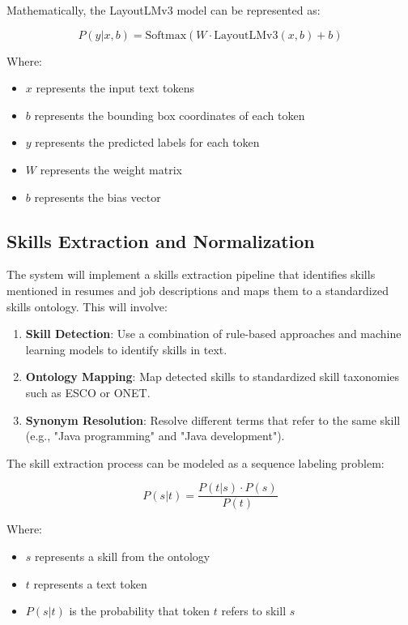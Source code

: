 \documentclass[12pt,a4paper]{report}
\begin{document}
Mathematically, the LayoutLMv3 model can be represented as:

\begin{equation}
    P(y|x, b) = \text{Softmax}(W \cdot \text{LayoutLMv3}(x, b) + b)
\end{equation}

Where:
\begin{itemize}
    \item $x$ represents the input text tokens
    \item $b$ represents the bounding box coordinates of each token
    \item $y$ represents the predicted labels for each token
    \item $W$ represents the weight matrix
    \item $b$ represents the bias vector
\end{itemize}

\subsection*{Skills Extraction and Normalization}

The system will implement a skills extraction pipeline that identifies skills mentioned in resumes and job descriptions and maps them to a standardized skills ontology. This will involve:

\begin{enumerate}
    \item \textbf{Skill Detection}: Use a combination of rule-based approaches and machine learning models to identify skills in text.
    \item \textbf{Ontology Mapping}: Map detected skills to standardized skill taxonomies such as ESCO or ONET.
    \item \textbf{Synonym Resolution}: Resolve different terms that refer to the same skill (e.g., "Java programming" and "Java development").
\end{enumerate}

The skill extraction process can be modeled as a sequence labeling problem:

\begin{equation}
    P(s|t) = \frac{P(t|s) \cdot P(s)}{P(t)}
\end{equation}

Where:
\begin{itemize}
    \item $s$ represents a skill from the ontology
    \item $t$ represents a text token
    \item $P(s|t)$ is the probability that token $t$ refers to skill $s$
\end{itemize}
\end{document}
